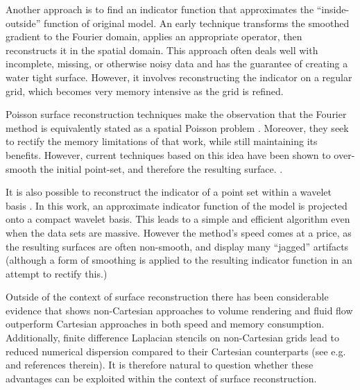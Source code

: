 Another approach is to find an indicator function that approximates the ``inside-outside'' function of original model. An early technique \cite{fftk} transforms the smoothed gradient to the Fourier domain, applies an appropriate operator, then reconstructs it in the spatial domain. This approach often deals well with incomplete, missing, or otherwise noisy data and has the guarantee of creating a water tight surface. However, it involves reconstructing the indicator on a regular grid, which becomes very memory intensive as the grid is refined.

Poisson surface reconstruction techniques make the observation that the Fourier method is equivalently stated as a spatial Poisson problem \cite{Kazhdan06,screenedk}. Moreover, they seek to rectify the memory limitations of that work, while still maintaining its benefits. However, current techniques based on this idea have been shown to over-smooth the initial point-set, and therefore the resulting surface. \cite{reconbench}.

It is also possible to reconstruct the indicator of a point set within a wavelet basis \cite{wavelet}. In this work, an approximate indicator function of the model is projected onto a compact wavelet basis. This leads to a simple and efficient algorithm even when the data sets are massive. However the method's speed comes at a price, as the resulting surfaces are often non-smooth, and display many ``jagged'' artifacts (although a form of smoothing is applied to the resulting indicator function in an attempt to rectify this.)

Outside of the context of surface reconstruction there has been considerable evidence that shows non-Cartesian approaches to volume rendering \cite{firstbox, practicalbox, hvolrecon} and fluid flow \cite{lboltzman} outperform Cartesian approaches in both speed and memory consumption. Additionally, finite difference Laplacian stencils on non-Cartesian grids lead to reduced numerical dispersion compared to their Cartesian  counterparts (see e.g. \cite{hamilton2013, hamilton2013hexagonal} and references therein). It is therefore natural to question whether these advantages can be exploited within the context of surface reconstruction. 

